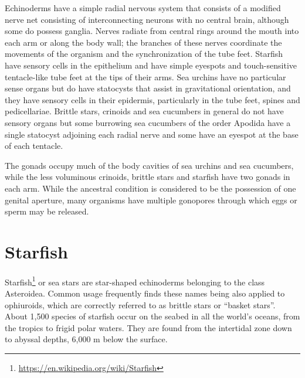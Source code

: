 \documentclass[]{book}
\let\rmarkdownfootnote\footnote%
\def\footnote{\protect\rmarkdownfootnote}
\renewcommand{\href}[2]{#2\footnote{\url{#1}}}
\theoremstyle{definition}
\theoremstyle{definition}
\theoremstyle{definition}
\theoremstyle{remark}
\begin{document}
Echinoderms have a simple radial nervous system that consists of a
modified nerve net consisting of interconnecting neurons with no central
brain, although some do possess ganglia. Nerves radiate from central
rings around the mouth into each arm or along the body wall; the
branches of these nerves coordinate the movements of the organism and
the synchronization of the tube feet. Starfish have sensory cells in the
epithelium and have simple eyespots and touch-sensitive tentacle-like
tube feet at the tips of their arms. Sea urchins have no particular
sense organs but do have statocysts that assist in gravitational
orientation, and they have sensory cells in their epidermis,
particularly in the tube feet, spines and pedicellariae. Brittle stars,
crinoids and sea cucumbers in general do not have sensory organs but
some burrowing sea cucumbers of the order Apodida have a single
statocyst adjoining each radial nerve and some have an eyespot at the
base of each tentacle.

The gonads occupy much of the body cavities of sea urchins and sea
cucumbers, while the less voluminous crinoids, brittle stars and
starfish have two gonads in each arm. While the ancestral condition is
considered to be the possession of one genital aperture, many organisms
have multiple gonopores through which eggs or sperm may be released.

\section{Starfish}\label{starfish}

\href{https://en.wikipedia.org/wiki/Starfish}{Starfish} or sea stars are
star-shaped echinoderms belonging to the class Asteroidea. Common usage
frequently finds these names being also applied to ophiuroids, which are
correctly referred to as brittle stars or ``basket stars''. About 1,500
species of starfish occur on the seabed in all the world's oceans, from
the tropics to frigid polar waters. They are found from the intertidal
zone down to abyssal depths, 6,000 m below the surface.
\end{document}
